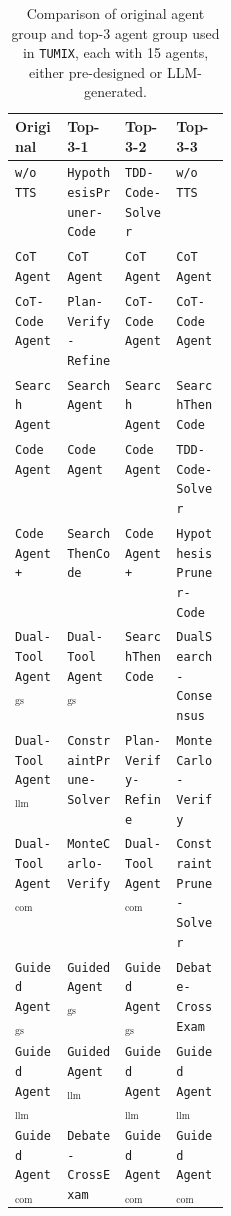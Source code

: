 \begin{table}[!ht]
\centering
\caption{Comparison of original agent group and top-3 agent group used in \texttt{TUMIX}, each with 15 agents, either pre-designed or LLM-generated.}
\label{tab:agent_group_original_top3}
\footnotesize
\setlength{\tabcolsep}{4pt}
\renewcommand{\arraystretch}{1.05}
\begin{tabular}{@{}lllp{0.25\linewidth}@{}}
\hline
\textbf{Original} & \textbf{Top-3-1} & \textbf{Top-3-2} & \textbf{Top-3-3}\\
\hline
\texttt{w/o TTS}        & \texttt{HypothesisPruner-Code} & \texttt{TDD-Code-Solver} & \texttt{w/o TTS} \\
\texttt{CoT Agent}      & \texttt{CoT Agent}  & \texttt{CoT Agent}  & \texttt{CoT Agent}  \\
\texttt{CoT-Code Agent} & \texttt{Plan-Verify-Refine}    & \texttt{CoT-Code Agent} & \texttt{CoT-Code Agent} \\
\texttt{Search Agent}   & \texttt{Search Agent}                      & \texttt{Search Agent}  & \texttt{SearchThenCode} \\
\texttt{Code Agent}     & \texttt{Code Agent}                      & \texttt{Code Agent}  & \texttt{TDD-Code-Solver} \\
\texttt{Code Agent+}    & \texttt{SearchThenCode}                      & \texttt{Code Agent+}  & \texttt{HypothesisPruner-Code}\\
\texttt{Dual-Tool Agent$_{\text{gs}}$}& \texttt{Dual-Tool Agent$_{\text{gs}}$}                      & \texttt{SearchThenCode}  & \texttt{DualSearch-Consensus} \\
\texttt{Dual-Tool Agent$_{\text{llm}}$}& \texttt{ConstraintPrune-Solver}                      & \texttt{Plan-Verify-Refine} & \texttt{MonteCarlo-Verify} \\
\texttt{Dual-Tool Agent$_{\text{com}}$}& \texttt{MonteCarlo-Verify}                      & \texttt{Dual-Tool Agent$_{\text{com}}$} & \texttt{ConstraintPrune-Solver}  \\
\texttt{Guided Agent$_{\text{gs}}$}   & \texttt{Guided Agent$_{\text{gs}}$}                     & \texttt{Guided Agent$_{\text{gs}}$}  & \texttt{Debate-CrossExam}\\
\texttt{Guided Agent$_{\text{llm}}$}   & \texttt{Guided Agent$_{\text{llm}}$}                     & \texttt{Guided Agent$_{\text{llm}}$}  & \texttt{Guided Agent$_{\text{llm}}$} \\
\texttt{Guided Agent$_{\text{com}}$}   & \texttt{Debate-CrossExam}                      & \texttt{Guided Agent$_{\text{com}}$}& \texttt{Guided Agent$_{\text{com}}$} \\

\end{tabular}
\end{table}
